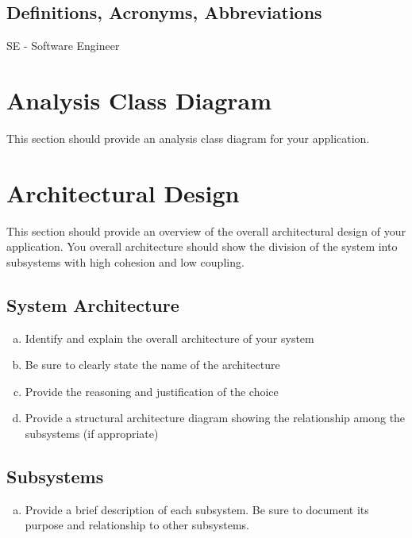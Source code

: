 \documentclass[]{article}
\begin{document}
\subsection{Definitions, Acronyms, Abbreviations}
\label{sub:definitions_acronyms_abbreviations}
SE - Software Engineer

\section{Analysis Class Diagram}
\label{sec:analysis_class_diagram}
This section should provide an analysis class diagram for your application.


\section{Architectural Design}
\label{sec:architectural_design}
This section should provide an overview of the overall architectural design of your application. You overall architecture should show the division of the system into subsystems with high cohesion and low coupling.

\subsection{System Architecture}
\label{sub:system_architecture}
\begin{enumerate}[a)]
	\item Identify and explain the overall architecture of your system
	\item Be sure to clearly state the name of the architecture
	\item Provide the reasoning and justification of the choice
	\item Provide a structural architecture diagram showing the relationship among the subsystems (if appropriate)
\end{enumerate}

\subsection{Subsystems}
\label{sub:subsystems}
\begin{enumerate}[a)]
	\item Provide a brief description of each subsystem. Be sure to document its purpose and relationship to other subsystems.
\end{enumerate}
\end{document}
